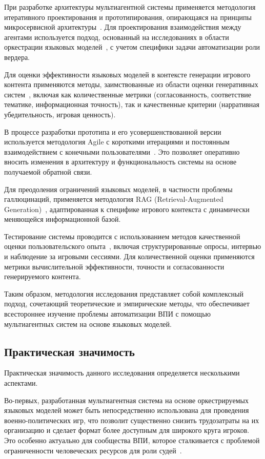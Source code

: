При разработке архитектуры мультиагентной системы применяется методология итеративного проектирования и прототипирования, опирающаяся на принципы микросервисной архитектуры~\cite{newman2021building}. Для проектирования взаимодействия между агентами используется подход, основанный на исследованиях в области оркестрации языковых моделей~\cite{shen2023hugginggpt}, с учетом специфики задачи автоматизации роли вердера.

Для оценки эффективности языковых моделей в контексте генерации игрового контента применяются методы, заимствованные из области оценки генеративных систем~\cite{zhou2023evaluation}, включая как количественные метрики (согласованность, соответствие тематике, информационная точность), так и качественные критерии (нарративная убедительность, игровая ценность).

В процессе разработки прототипа и его усовершенствованной версии используется методология Agile с короткими итерациями и постоянным взаимодействием с конечными пользователями~\cite{martin2019clean}. Это позволяет оперативно вносить изменения в архитектуру и функциональность системы на основе получаемой обратной связи.

Для преодоления ограничений языковых моделей, в частности проблемы галлюцинаций, применяется методология RAG (Retrieval-Augmented Generation)~\cite{lewis2020retrieval}, адаптированная к специфике игрового контекста с динамически меняющейся информационной базой.

Тестирование системы проводится с использованием методов качественной оценки пользовательского опыта~\cite{albert2013measuring}, включая структурированные опросы, интервью и наблюдение за игровыми сессиями. Для количественной оценки применяются метрики вычислительной эффективности, точности и согласованности генерируемого контента.

Таким образом, методология исследования представляет собой комплексный подход, сочетающий теоретические и эмпирические методы, что обеспечивает всестороннее изучение проблемы автоматизации ВПИ с помощью мультиагентных систем на основе языковых моделей.

\subsection*{Практическая значимость}

Практическая значимость данного исследования определяется несколькими аспектами.

Во-первых, разработанная мультиагентная система на основе оркестрируемых языковых моделей может быть непосредственно использована для проведения военно-политических игр, что позволит существенно снизить трудозатраты на их организацию и сделает формат более доступным для широкого круга игроков. Это особенно актуально для сообщества ВПИ, которое сталкивается с проблемой ограниченности человеческих ресурсов для роли судей~\cite{catalogwpg2023}.

